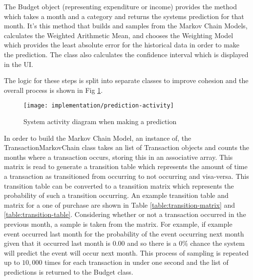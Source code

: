 The Budget object (representing expenditure or income) provides the  method which takes a month and a category and returns the systems prediction for that month. It's this method that builds and samples from the Markov Chain Models, calculates the Weighted Arithmetic Mean, and chooses the Weighting Model which provides the least absolute error for the historical data in order to make the prediction. The class also calculates the confidence interval which is displayed in the UI.

The logic for these steps is split into separate classes to improve cohesion and the overall process is shown in Fig \ref{fig:prediction-activity}. 

\begin{figure}[h]
    \centering
    \texttt{[image: implementation/prediction-activity]}
    \caption{System activity diagram when making a prediction}
    \label{fig:prediction-activity}
    
    \begin{comment}
(start)->|a|
|a|->[Markov Chain]->(Build MCMs)->(Sample from MCMs)->|b|
|a|->[Weighted Average Calculator]->(Select Weighting Model)->(Calculate Weighted Averages)->|b|
|b|->[Prediction Evaluator]->(Calculate Average and Confidence)->(end)
    \end{comment}
\end{figure}

In order to build the Markov Chain Model, an instance of, the TransactionMarkovChain class takes an list of Transaction objects and counts the months where a transaction occurs, storing this in an associative array. This matrix is read to generate a transition table which represents the amount of time a transaction as transitioned from occurring to not occurring and visa-versa. This transition table can be converted to a transition matrix which represents the probability of such a transition occurring. An example transition table and matrix for a one of purchase are shown in Table \ref{table:transition-matrix} and \ref{table:transition-table}.
%
Considering whether or not a transaction occurred in the previous month, a sample is taken from the matrix. For example, if example event occurred last month for the probability of the event occurring next month given that it occurred last month is $0.00$ and so there is a 0\% chance the system will predict the event will occur next month. This process of sampling is repeated up to $10,000$ times for each transaction in under one second and the list of predictions is returned to the Budget class.


